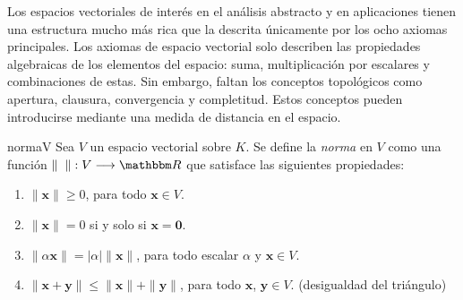 Los espacios vectoriales de interés en el análisis abstracto y en aplicaciones tienen una estructura mucho más rica que la descrita únicamente por los ocho axiomas principales. Los axiomas de espacio vectorial solo describen las propiedades algebraicas de los elementos del espacio: suma, multiplicación por escalares y combinaciones de estas. Sin embargo, faltan los conceptos topológicos como apertura, clausura, convergencia y completitud. Estos conceptos pueden introducirse mediante una medida de distancia en el espacio.

\begin{definicion}{}{normaV}
    Sea $V$ un espacio vectorial sobre $K$. Se define la \emph{norma} en $V$ como una función $\| \phantom{x} \| : V \longrightarrow \RR$ que satisface las siguientes propiedades:
    \begin{enumerate}[label=\roman*), topsep=6pt, itemsep=0pt]
        \item $\| \mathbf{x} \| \geq 0$, para todo $\mathbf{x} \in V$.
        \item $\| \mathbf{x} \| = 0$ si y solo si $\mathbf{x} = \mathbf{0}$.
        \item $\| \alpha \mathbf{x} \| = |\alpha| \| \mathbf{x} \|$, para todo escalar $\alpha$ y $\mathbf{x} \in V$.
        \item $\| \mathbf{x} + \mathbf{y} \| \leq \| \mathbf{x} \| + \| \mathbf{y} \|$, para todo $\mathbf{x}$, $\mathbf{y} \in V$. \hfill (desigualdad del triángulo)
    \end{enumerate}
\end{definicion}

